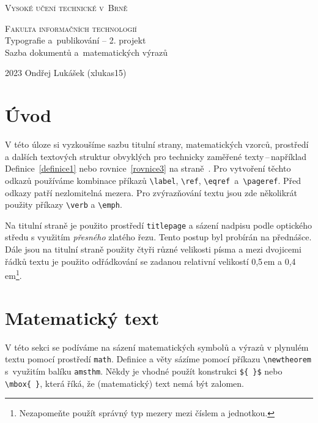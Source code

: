 \documentclass[11pt, a4paper, twocolumn]{article}
\theoremstyle{definition}
\begin{document}
\begin{titlepage}
\begin{center}
\Huge \textsc{Vysoké učení technické v~Brně}

\huge \textsc{Fakulta informačních technologií}\\
{\LARGE Typografie a~publikování -- 2. projekt\\
Sazba dokumentů a~matematických výrazů\\}
\end{center}
{\Large 2023 \hfill Ondřej Lukášek (xlukas15)}
\end{titlepage}

\section*{Úvod}

V této úloze si vyzkoušíme sazbu titulní strany, ma\-te\-ma\-tic\-kých vzorců, prostředí a dalších textových struktur obvyklých pro technicky zaměřené texty\,--\,například De\-fi\-ni\-ce~\ref{definice1} nebo rovnice~\eqref{rovnice3} na straně~\pageref{rovnice3}. Pro vytvoření těchto odkazů používáme kombinace příkazů \texttt{\textbackslash label}, \texttt{\textbackslash ref}, \texttt{\textbackslash eqref}~a~\texttt{\textbackslash pageref}. Před odkazy patří nezlomitelná mezera. Pro zvýrazňování textu jsou zde několikrát po\-u\-ži\-ty příkazy \texttt{\textbackslash verb} a \texttt{\textbackslash emph}.\par
Na titulní straně je použito prostředí \texttt{titlepage} a sá\-ze\-ní nadpisu podle optického středu s využitím \emph{přesného} zlatého řezu. Tento postup byl probírán na přednášce. Dále jsou na titulní straně použity čtyři různé velikosti písma a mezi dvojicemi řádků textu je použito odřádkování se zadanou relativní velikostí 0,5\,em a 0,4\,em\footnote{Nezapomeňte použít správný typ mezery mezi číslem a jednotkou.}.

\section{Matematický text}

V této sekci se podíváme na sázení matematických sym\-bo\-lů a výrazů v plynulém textu pomocí prostředí \texttt{math}. Definice a věty sázíme pomocí příkazu \texttt{\textbackslash newtheorem} s~využitím balíku \texttt{amsthm}. Někdy je vhodné použít kon\-struk\-ci \texttt{\$\{\,\}\$} nebo \texttt{\textbackslash mbox\{\,\}}, která říká, že (matematický) text nemá být zalomen.
\end{document}

